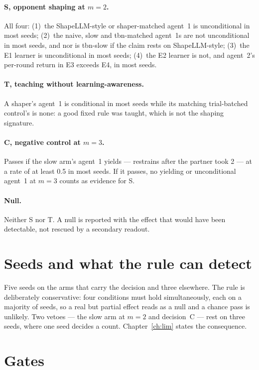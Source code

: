 \paragraph{S, opponent shaping at \(m=2\).} All four:
(1)~the ShapeLLM-style or shaper-matched agent~1 is unconditional in most
seeds;
(2)~the naive, slow and tbn-matched agent~1s are not unconditional in most
seeds, and nor is tbn-slow if the claim rests on ShapeLLM-style;
(3)~the E1 learner is unconditional in most seeds;
(4)~the E2 learner is not, and agent~2's per-round return in E3 exceeds E4,
in most seeds.

\paragraph{T, teaching without learning-awareness.}
A shaper's agent~1 is conditional in most seeds while its matching
trial-batched control's is none: a good fixed rule was taught, which is not
the shaping signature.

\paragraph{C, negative control at \(m=3\).}
Passes if the slow arm's agent~1 yields --- restrains after the partner took
2 --- at a rate of at least 0.5 in most seeds.
If it passes, no yielding or unconditional agent~1 at \(m=3\) counts as
evidence for S.

\paragraph{Null.} Neither S nor T.
A null is reported with the effect that would have been detectable, not
rescued by a secondary readout.

\section{Seeds and what the rule can detect}
\label{sec:power}

Five seeds on the arms that carry the decision and three elsewhere.
The rule is deliberately conservative: four conditions must hold
simultaneously, each on a majority of seeds, so a real but partial effect
reads as a null and a chance pass is unlikely.
Two vetoes --- the slow arm at \(m=2\) and decision~C --- rest on three
seeds, where one seed decides a count.
Chapter~\ref{ch:lim} states the consequence.

\section{Gates}
\label{sec:gates}

